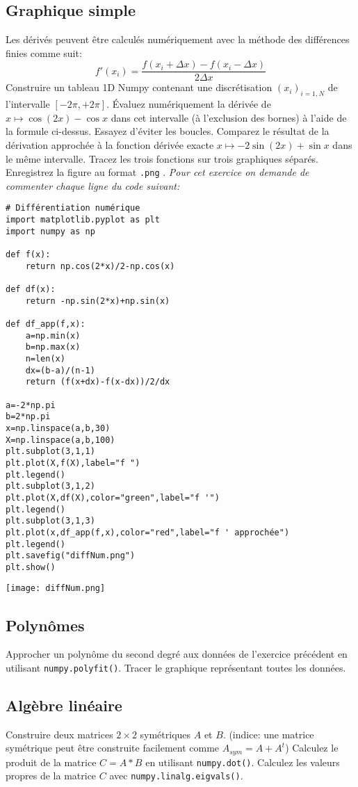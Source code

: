 \documentclass[a4paper]{article}
\begin{document}
\subsection{Graphique simple}
\noindent Les dérivés peuvent être calculés numériquement avec la méthode des différences finies comme suit:
\[f'(x_i)=\frac{f(x_i+\Delta x)-f(x_i-\Delta x)}{2\Delta x}
\]
Construire un tableau 1D Numpy contenant une discrétisation  $(x_i)_{i=1,N}$ de l'intervalle $[-2\pi , +2\pi ]$. Évaluez numériquement la dérivée de $x\mapsto \cos (2x)-\cos x$ dans cet intervalle (à l'exclusion des bornes) à l'aide de la formule ci-dessus. Essayez d'éviter les boucles. Comparez le résultat de la dérivation approchée à la fonction dérivée exacte $x\mapsto -2\sin (2x)+\sin x$ dans le même intervalle. Tracez les trois fonctions sur trois graphiques séparés. Enregistrez la figure au format {\tt .png} .
{\em Pour cet exercice on demande de commenter chaque ligne du code suivant:}
\begin{lstlisting}
# Différentiation numérique
import matplotlib.pyplot as plt
import numpy as np

def f(x):
    return np.cos(2*x)/2-np.cos(x)

def df(x):
    return -np.sin(2*x)+np.sin(x)

def df_app(f,x):
    a=np.min(x)
    b=np.max(x)
    n=len(x)
    dx=(b-a)/(n-1)
    return (f(x+dx)-f(x-dx))/2/dx

a=-2*np.pi
b=2*np.pi
x=np.linspace(a,b,30)
X=np.linspace(a,b,100)
plt.subplot(3,1,1)
plt.plot(X,f(X),label="f ")
plt.legend()
plt.subplot(3,1,2)
plt.plot(X,df(X),color="green",label="f '")
plt.legend()
plt.subplot(3,1,3)
plt.plot(x,df_app(f,x),color="red",label="f ' approchée")
plt.legend()
plt.savefig("diffNum.png")
plt.show()
\end{lstlisting}

 \begin{center}
 \texttt{[image: diffNum.png]}
\end{center}

\subsection{Polynômes}
Approcher un polynôme du second degré aux données de l'exercice précédent en utilisant {\tt numpy.polyfit()}. Tracer le graphique représentant toutes les données.
\subsection{Algèbre linéaire}
Construire deux matrices $2\times 2$ symétriques $A$ et $B$.
(indice: une matrice symétrique peut être construite facilement comme $A_{sym} = A + A^t$)
Calculez le produit de la matrice $C = A * B$ en utilisant {\tt numpy.dot()}.
Calculez les valeurs propres de la matrice $C$ avec {\tt numpy.linalg.eigvals()}.
\end{document}
